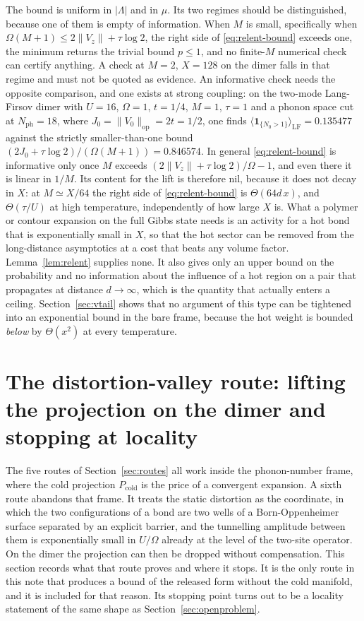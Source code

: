 \documentclass[11pt]{article}
\theoremstyle{definition}
\theoremstyle{remark}
\newcommand{\cold}{\mathrm{cold}}
\newcommand{\LF}{\mathrm{LF}}
\begin{document}
The bound is uniform in $|\Lambda|$ and in $\mu$. Its two regimes should be
distinguished, because one of them is empty of information. When $M$ is small,
specifically when $\Omega(M+1)\le2\|V_{z}\|+\tau\log2$, the right side of
\eqref{eq:relent-bound} exceeds one, the minimum returns the trivial bound $p\le1$, and
no finite-$M$ numerical check can certify anything. A check at $M=2$, $X=128$ on
the dimer falls in that regime and must not be quoted as evidence. An informative
check needs the opposite comparison, and one exists at strong coupling: on the
two-mode Lang-Firsov dimer with $U=16$, $\Omega=1$, $t=1/4$, $M=1$, $\tau=1$ and a
phonon space cut at $N_{\mathrm{ph}}=18$, where $J_{0}=\lVert V_{0}\rVert_{\mathrm{op}}=2t=1/2$,
one finds $\langle\mathbf{1}_{\{N_{0}>1\}}\rangle_{\LF}=0.135477$ against the
strictly smaller-than-one bound $(2J_{0}+\tau\log2)/(\Omega(M+1))=0.846574$.
In general \eqref{eq:relent-bound} is informative only once $M$ exceeds
$(2\|V_{z}\|+\tau\log2)/\Omega-1$, and even there it is linear in $1/M$. Its
content for the lift is therefore nil, because it does not decay in $X$: at
$M\simeq X/64$ the right side of \eqref{eq:relent-bound} is $\Theta(64d\,x)$, and
$\Theta(\tau/U)$ at high temperature, independently of how large $X$ is. What a polymer or contour expansion on the
full Gibbs state needs is an activity for a hot bond that is exponentially small
in $X$, so that the hot sector can be removed from the long-distance asymptotics
at a cost that beats any volume factor. Lemma~\ref{lem:relent} supplies none. It
also gives only an upper bound on the probability and no information about the
influence of a hot region on a pair that propagates at distance $d\to\infty$,
which is the quantity that actually enters a ceiling. Section~\ref{sec:vtail}
shows that no argument of this type can be tightened into an exponential bound in
the bare frame, because the hot weight is bounded \emph{below} by
$\Theta(x^{2})$ at every temperature.

\section{The distortion-valley route: lifting the projection on the dimer and
stopping at locality}
\label{sec:valley}

The five routes of Section~\ref{sec:routes} all work inside the phonon-number
frame, where the cold projection $P_{\cold}$ is the price of a convergent
expansion. A sixth route abandons that frame. It treats the static distortion as
the coordinate, in which the two configurations of a bond are two wells of a
Born-Oppenheimer surface separated by an explicit barrier, and the tunnelling
amplitude between them is exponentially small in $U/\Omega$ already at the level
of the two-site operator. On the dimer the projection can then be dropped without
compensation. This section records what that route proves and where it stops. It
is the only route in this note that produces a bound of the released form without
the cold manifold, and it is included for that reason. Its stopping point turns
out to be a locality statement of the same shape as Section~\ref{sec:openproblem}.
\end{document}
